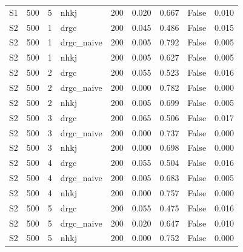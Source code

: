 \begin{table}[htbp]
\begin{tabular}{lcclccccc}
S1 & 500 & 5 & nhkj & 200 & 0.020 & 0.667 & False & 0.010 \\
S2 & 500 & 1 & drgc & 200 & 0.045 & 0.486 & False & 0.015 \\
S2 & 500 & 1 & drgc\_naive & 200 & 0.005 & 0.792 & False & 0.005 \\
S2 & 500 & 1 & nhkj & 200 & 0.005 & 0.627 & False & 0.005 \\
S2 & 500 & 2 & drgc & 200 & 0.055 & 0.523 & False & 0.016 \\
S2 & 500 & 2 & drgc\_naive & 200 & 0.000 & 0.782 & False & 0.000 \\
S2 & 500 & 2 & nhkj & 200 & 0.005 & 0.699 & False & 0.005 \\
S2 & 500 & 3 & drgc & 200 & 0.065 & 0.506 & False & 0.017 \\
S2 & 500 & 3 & drgc\_naive & 200 & 0.000 & 0.737 & False & 0.000 \\
S2 & 500 & 3 & nhkj & 200 & 0.000 & 0.698 & False & 0.000 \\
S2 & 500 & 4 & drgc & 200 & 0.055 & 0.504 & False & 0.016 \\
S2 & 500 & 4 & drgc\_naive & 200 & 0.005 & 0.683 & False & 0.005 \\
S2 & 500 & 4 & nhkj & 200 & 0.000 & 0.757 & False & 0.000 \\
S2 & 500 & 5 & drgc & 200 & 0.055 & 0.475 & False & 0.016 \\
S2 & 500 & 5 & drgc\_naive & 200 & 0.020 & 0.647 & False & 0.010 \\
S2 & 500 & 5 & nhkj & 200 & 0.000 & 0.752 & False & 0.000 \\
\bottomrule
\end{tabular}
\end{table}
